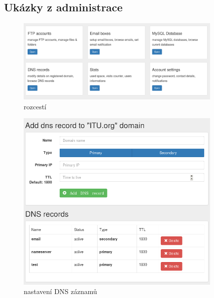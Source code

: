 \documentclass[11pt,a4paper]{article}
\begin{document}
    \subsection{Ukázky z administrace}

    \begin{figure}[ht]
      \begin{center}
        \includegraphics[width=10cm]{dashboard}
        \caption{rozcestí}
      \end{center}
    \end{figure}

    \begin{figure}[ht]
      \begin{center}
        \includegraphics[width=10cm]{dns}
        \caption{nastavení DNS záznamů}
      \end{center}
    \end{figure}
\end{document}
